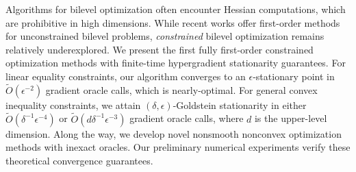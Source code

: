 
Algorithms for bilevel optimization often encounter Hessian computations, which are prohibitive in high dimensions. While recent works offer first-order methods for {unconstrained} bilevel problems, \textit{constrained} bilevel optimization remains relatively underexplored. We present {the first} fully first-order constrained optimization methods with finite-time hypergradient stationarity guarantees. For linear equality constraints, our algorithm converges to an $\epsilon$-stationary point in $\widetilde{O}(\epsilon^{-2})$ gradient oracle calls, which is nearly-optimal. For general convex inequality constraints, we attain $(\delta,\epsilon)$-Goldstein stationarity in either $\widetilde{O}({\delta^{-1} \epsilon^{-4}})$ or $\widetilde{O}(d{\delta^{-1} \epsilon^{-3}})$ gradient oracle calls, where $d$ is the upper-level dimension. Along the way, we develop novel nonsmooth nonconvex optimization methods with inexact oracles. Our preliminary numerical experiments verify these theoretical convergence guarantees.